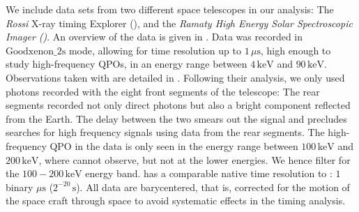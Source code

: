 \documentclass{emulateapj}
\begin{document}
We include data sets from two different space telescopes in our analysis: The {\it Rossi} X-ray timing Explorer (\rxte), and the {\it Ramaty High Energy Solar Spectroscopic Imager (\rhessi)}. An overview of the \rxte data is given in \citet{Israel05}. Data was recorded in $\mathrm{Goodxenon\_2s}$ mode, allowing for time resolution up to $1 \, \mu \mathrm{s}$, high enough to study high-frequency QPOs, in an energy range between $4 \, \mathrm{keV}$ and $90 \, \mathrm{keV}$.
Observations taken with \rhessi are detailed in \citet{Watts06}. Following their analysis, we only used photons recorded with the eight front segments of the telescope: The rear segments recorded not only direct photons but also a bright component reflected from the Earth. The delay between the two smears out the signal and precludes searches for high frequency signals using data from the rear segments. The high-frequency QPO in the \rhessi data is only seen in the energy range between $100 \, \mathrm{keV}$ and $200 \, \mathrm{keV}$, where \rxte cannot observe, but not at the lower energies. We hence filter for the $100 - 200 \, \mathrm{keV}$ energy band.  \rhessi has a comparable native time resolution to \rxte: $1$ binary $\mu\mathrm{s}$ ($2^{-20} \, \mathrm{s}$). All data are barycentered, that is, corrected for the motion of the space craft through space to avoid systematic effects in the timing analysis.
\end{document}
